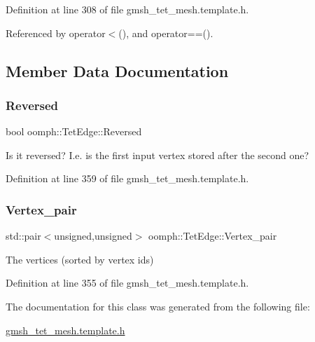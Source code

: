 Definition at line 308 of file gmsh\+\_\+tet\+\_\+mesh.\+template.\+h.



Referenced by operator$<$(), and operator==().



\subsection{Member Data Documentation}
\mbox{\label{classoomph_1_1TetEdge_ad2832c145c84cf2655a2c02a8e86a4fa}} 
\subsubsection{\texorpdfstring{Reversed}{Reversed}}
{\footnotesize\ttfamily bool oomph\+::\+Tet\+Edge\+::\+Reversed\hspace{0.3cm}{\ttfamily [private]}}



Is it reversed? I.\+e. is the first input vertex stored after the second one? 



Definition at line 359 of file gmsh\+\_\+tet\+\_\+mesh.\+template.\+h.

\mbox{\label{classoomph_1_1TetEdge_a6dc6e07e15c5ffd5a2d7c162f4322eef}} 
\subsubsection{\texorpdfstring{Vertex\+\_\+pair}{Vertex\_pair}}
{\footnotesize\ttfamily std\+::pair$<$unsigned,unsigned$>$ oomph\+::\+Tet\+Edge\+::\+Vertex\+\_\+pair\hspace{0.3cm}{\ttfamily [private]}}



The vertices (sorted by vertex ids) 



Definition at line 355 of file gmsh\+\_\+tet\+\_\+mesh.\+template.\+h.



The documentation for this class was generated from the following file\+:\begin{DoxyCompactItemize}
\item 
\hyperlink{gmsh__tet__mesh_8template_8h}{gmsh\+\_\+tet\+\_\+mesh.\+template.\+h}\end{DoxyCompactItemize}
